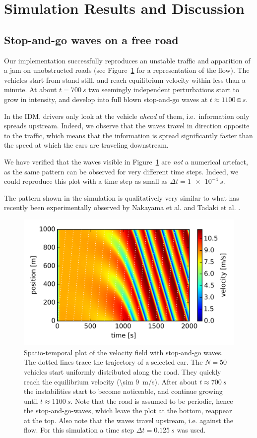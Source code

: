 \section{Simulation Results and Discussion}
\subsection{Stop-and-go waves on a free road}
Our implementation successfully reproduces an unstable traffic and apparition of a jam on unobstructed roads (see Figure~\ref{fig:free_road} for a representation of the flow). The vehicles start from stand-still, and reach equilibrium velocity within less than a minute. At about $t=\SI{700}{s}$ two seemingly independent perturbations start to grow in intensity, and develop into full blown stop-and-go waves at $t\approx \SI{1100}☺{s}$.

In the IDM, drivers only look at the vehicle \emph{ahead} of them, i.e.\ information only spreads upstream. Indeed, we observe that the waves travel in direction opposite to the traffic, which means that the information is spread significantly faster than the speed at which the cars are traveling downstream.

We have verified that the waves visible in Figure~\ref{fig:free_road} are \emph{not} a numerical artefact, as the same pattern can be observed for very different time steps. Indeed, we could reproduce this plot with a time step as small as $\Delta t =\SI{1e-4}{s}$.

The pattern shown in the simulation is qualitatively very similar to what has recently been experimentally observed by Nakayama et al. \cite{nakayama2009} and Tadaki et al. \cite{tadaki2013}.
\begin{figure}
    \centering
    \includegraphics[width=5in]{../img/free_road.png}
    \caption{Spatio-temporal plot of the velocity field with stop-and-go waves. The dotted lines trace the trajectory of a selected car. The $N=50$ vehicles start uniformly distributed along the road. They quickly reach the equilibrium velocity (\SI{\sim 9}{m/s}). After about $t\approx\SI{700}{s}$ the instabilities start to become noticeable, and continue growing until $t\approx \SI{1100}{s}$. Note that the road is assumed to be periodic, hence the stop-and-go-waves, which leave the plot at the bottom, reappear at the top. Also note that the waves travel upstream, i.e. against the flow. For this simulation a time step $\Delta t=\SI{0.125}{s}$ was used.}
    \label{fig:free_road}
\end{figure}
\newpage

